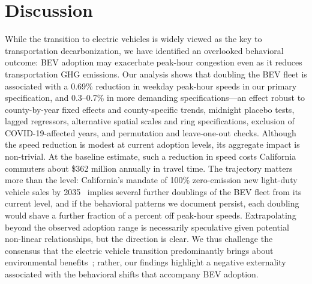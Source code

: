 \documentclass[11pt, letterpaper]{article}
\begin{document}
\section{Discussion}\label{sec:discussion}
While the transition to electric vehicles is widely viewed as the key to transportation decarbonization, we have identified an overlooked behavioral outcome: BEV adoption may exacerbate peak-hour congestion even as it reduces transportation GHG emissions.
Our analysis shows that doubling the BEV fleet is associated with a 0.69\% reduction in weekday peak-hour speeds in our primary specification, and 0.3--0.7\% in more demanding specifications---an effect robust to county-by-year fixed effects and county-specific trends, midnight placebo tests, lagged regressors, alternative spatial scales and ring specifications, exclusion of COVID-19-affected years, and permutation and leave-one-out checks.
Although the speed reduction is modest at current adoption levels, its aggregate impact is non-trivial.
At the baseline estimate, such a reduction in speed costs California commuters about \$362 million annually in travel time.
The trajectory matters more than the level: California's mandate of 100\% zero-emission new light-duty vehicle sales by 2035~\citep{CARB2022} implies several further doublings of the BEV fleet from its current level, and if the behavioral patterns we document persist, each doubling would shave a further fraction of a percent off peak-hour speeds.
Extrapolating beyond the observed adoption range is necessarily speculative given potential non-linear relationships, but the direction is clear.
We thus challenge the consensus that the electric vehicle transition predominantly brings about environmental benefits~\citep{IEA2026, Tilly2024}; rather, our findings highlight a negative externality associated with the behavioral shifts that accompany BEV adoption.
\end{document}
